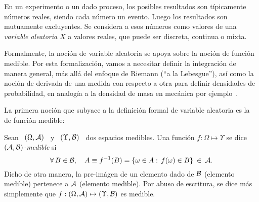 \label{Sec:MP:variablealeatoria}

En un experimento  o un dado proceso, los  posibles resultados son t\'ipicamente
n\'umeros  reales, siendo  cada n\'umero  un evento.   Luego los  resultados son
mutuamente  excluyentes. Se  considera  a  esos n\'umeros  como  valores de  una
\emph{variable aleatoria} $X$ a valores reales, que puede ser discreta, continua
o mixta.

Formalmente, la  noci\'on de  variable aleatoria se  apoya sobre la  noci\'on de
funci\'on  medible.  Por  esta  formalizaci\'on, vamos  a  necesitar definir  la
integraci\'on de  manera general,  m\'as all\'a del  enfoque de Riemann  (``a la
Lebesgue''), as\'i  como la noci\'on  de derivada de  una medida con  respecto a
otra para  definir densidades  de probabilidad, en  analog\'ia a la  densidad de
masa en mec\'anica por ejemplo~\cite{Leb04, Leb18, KolFom61, AthLah06, Bog07:v1,
  Coh13}.



\label{Ssec:MP:VAPreliminaria}

La primera noci\'on  que subyace a la definici\'on  formal de variable aleatoria
es la de funci\'on medible:

\begin{definicion}
  Sean  \ $(\Omega,\mathcal{A})$  \ y  \ $(\Upsilon,\mathcal{B})$  \ dos  espacios  medibles.  Una
  funci\'on $f: \Omega \mapsto \Upsilon$ se dice {\it $(\mathcal{A},\mathcal{B})$-medible} si
  \[
  \forall \,  B \in  \mathcal{B}, \quad  A \equiv f^{-1}(B)  = \left\{  \omega \in  A: \,
    f(\omega) \in B \right\} \: \in \: \mathcal{A}.
  \]
  Dicho de  otra manera,  la pre-im\'agen  de un elemento  dado de  $\mathcal{B}$ (elemento
  medible) pertenece a $\mathcal{A}$ (elemento medible).  Por abuso de escritura, se dice
  m\'as simplemente que $f: (\Omega,\mathcal{A}) \mapsto (\Upsilon,\mathcal{B})$ es medible.
\end{definicion}

